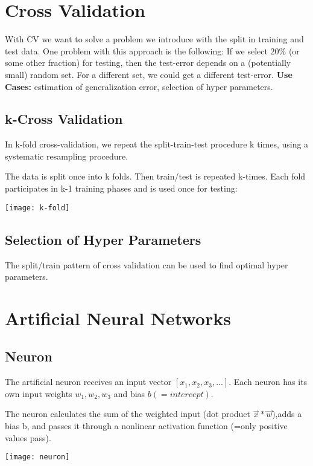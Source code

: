 \section{Cross Validation}
With CV we want to solve a problem we introduce with the split in training and test data.  One problem with this approach is the following: If we select 20\% (or some other fraction) for testing, then the test-error depends on a (potentially small) random set. For a different set, we could get a different test-error. \textbf{Use Cases:} estimation of generalization error, selection of hyper parameters.

\subsection{k-Cross Validation}
\begin{minipage}{0,5\linewidth}
	 In k-fold cross-validation, we repeat the split-train-test procedure k times, using a systematic resampling procedure. 
	 
	  The data is split once into k folds. Then train/test is repeated k-times. Each fold participates in k-1 training phases and is used once for testing:
 
\end{minipage}
\begin{minipage}{0,5\linewidth}
	\texttt{[image: k-fold]}
\end{minipage}

\subsection{Selection of Hyper Parameters}
The split/train pattern of cross validation can be used to find optimal hyper parameters.

\section{Artificial Neural Networks}
\subsection{Neuron}
\begin{minipage}{0,5\linewidth}
	The artificial neuron receives an input vector $[x_{1},x_{2},x_{3},...]$. Each neuron has its own input weights $w_{1},w_{2},w_{3}$ and bias $b (=intercept)$.
	
	The neuron calculates the sum of the weighted input (dot product $\vec{x} * \vec{w}$),adds a bias b, and passes it through a nonlinear activation function (=only positive values pass).
\end{minipage}
\begin{minipage}{0,5\linewidth}
	\texttt{[image: neuron]}
\end{minipage}

